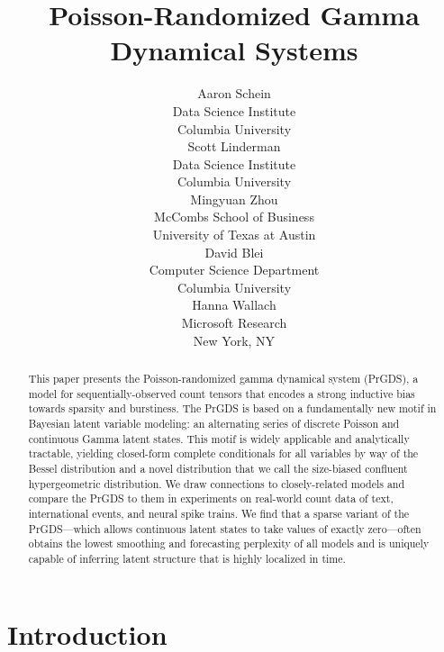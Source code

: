\documentclass{article}
\title{Poisson-Randomized Gamma Dynamical Systems}
\author{%
  Aaron Schein \\
  Data Science Institute\\
  Columbia University\\
  \And
  Scott Linderman \\
  Data Science Institute\\
  Columbia University\\
  \AND
  Mingyuan Zhou \\
  McCombs School of Business\\
  University of Texas at Austin\\
  \And
  David Blei \\
  Computer Science Department\\
  Columbia University\\
  \And
  Hanna Wallach \\
  Microsoft Research\\
  New York, NY\\
}
\begin{document}
\maketitle

\begin{abstract}
This paper presents the Poisson-randomized gamma dynamical system (PrGDS), a model for sequentially-observed count tensors that encodes a strong inductive bias towards sparsity and burstiness. The PrGDS is based on a fundamentally new motif in Bayesian latent variable modeling: an alternating series of discrete Poisson and continuous Gamma latent states. This motif is widely applicable and analytically tractable, yielding closed-form complete conditionals for all variables by way of the Bessel distribution and a novel distribution that we call the size-biased confluent hypergeometric distribution. We draw connections to closely-related models and compare the PrGDS to them in experiments on real-world count data of text, international events, and neural spike trains. We find that a sparse variant of the PrGDS---which allows continuous latent states to take values of exactly zero---often obtains the lowest smoothing and forecasting perplexity of all models and is uniquely capable of inferring latent structure that is highly localized in time.~
\end{abstract}

\section{Introduction}
\end{document}
